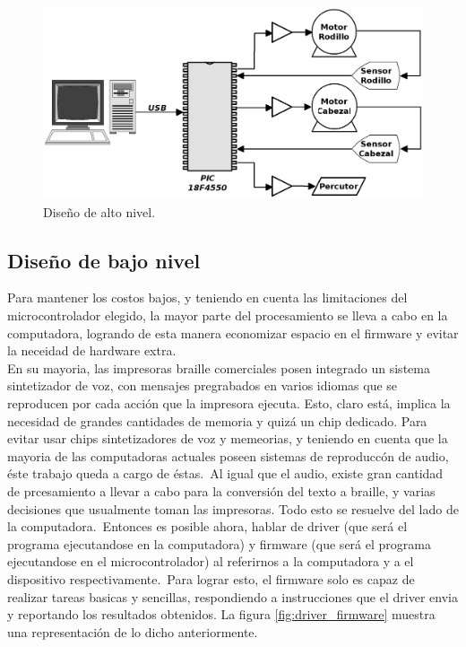\begin{figure}[htp]
\centering
\includegraphics[width=13cm]{./img/pc_uc_motors.png}
\caption{Dise\~no de alto nivel.}
\label{fig:pc_uc_motors}
\end{figure}



\subsection{Dise\~no de bajo nivel}
%
Para mantener los costos bajos, y teniendo en cuenta las limitaciones del
microcontrolador elegido, la mayor parte del procesamiento se lleva a cabo
en la computadora, logrando de esta manera economizar espacio en el firmware y
evitar la neceidad de hardware extra.\\

En su mayoria, las impresoras braille comerciales posen integrado un sistema
sintetizador de voz, con mensajes pregrabados en varios idiomas que se
reproducen por cada acci\'on que la impresora ejecuta. Esto, claro est\'a,
implica la necesidad de grandes cantidades de memoria y quiz\'a un chip
dedicado. Para evitar usar chips sintetizadores de voz y memeorias, y
teniendo en cuenta que la mayoria de las computadoras actuales poseen sistemas
de reproducc\'on de audio, \'este trabajo queda a cargo de \'estas.\
Al igual que el audio, existe gran cantidad de prcesamiento a llevar a cabo
para la conversi\'on del texto a braille, y varias decisiones que usualmente
toman las impresoras. Todo esto se resuelve del lado de la computadora.\
Entonces es posible ahora, hablar de driver (que ser\'a el programa
ejecutandose en la computadora) y firmware (que ser\'a el programa ejecutandose
en el microcontrolador) al referirnos a la computadora y a el dispositivo
respectivamente.\
Para lograr esto, el firmware solo es capaz de realizar tareas basicas y
sencillas, respondiendo a instrucciones que el driver envia y reportando los
resultados obtenidos. La figura \ref{fig:driver_firmware} muestra una
representaci\'on de lo dicho anteriormente.\\

